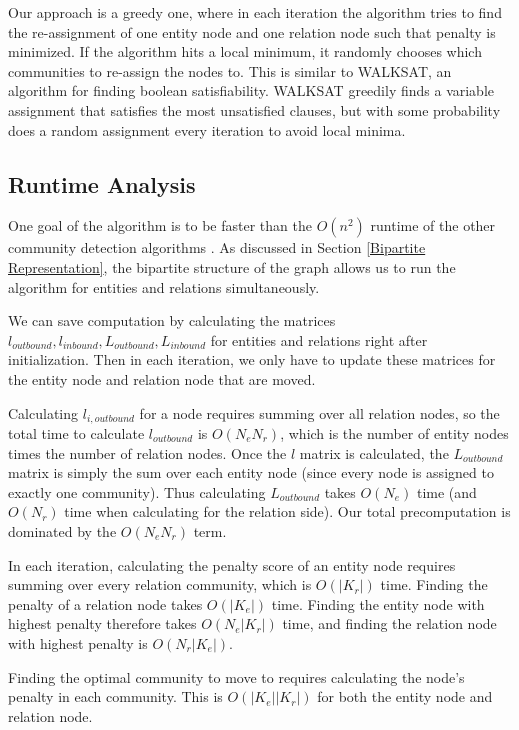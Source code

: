\documentclass[12pt]{article}
\begin{document}
Our approach is a greedy one, where in each iteration the algorithm tries to
find the re-assignment of one entity node and one relation node such that
penalty is minimized. If the algorithm hits a local minimum, it randomly chooses
which communities to re-assign the nodes to. This is similar to WALKSAT, an
algorithm for finding boolean satisfiability. WALKSAT greedily finds a variable
assignment that satisfies the most unsatisfied clauses, but with some
probability does a random assignment every iteration to avoid local minima.

\subsection{Runtime Analysis}
\label{Runtime Analysis}

One goal of the algorithm is to be faster than the $O(n^2)$ runtime of the other
community detection algorithms \cite{Kernighan1970, Girvan2002, Larremore2014}.
As discussed in Section \ref{Bipartite Representation}, the bipartite structure
of the graph allows us to run the algorithm for entities and relations
simultaneously.

We can save computation by calculating the matrices $l_{outbound}, l_{inbound},
L_{outbound}, L_{inbound}$ for entities and relations right after
initialization. Then in each iteration, we only have to update these matrices
for the entity node and relation node that are moved.

Calculating $l_{i, outbound}$ for a node requires summing over all relation
nodes, so the total time to calculate $l_{outbound}$ is $O(N_eN_r)$, which is
the number of entity nodes times the number of relation nodes. Once the $l$
matrix is calculated, the $L_{outbound}$ matrix is simply the sum over each
entity node (since every node is assigned to exactly one community). Thus
calculating $L_{outbound}$ takes $O(N_e)$ time (and $O(N_r)$ time when
calculating for the relation side). Our total precomputation is dominated by the
$O(N_eN_r)$ term.

In each iteration, calculating the penalty score of an entity node requires
summing over every relation community, which is $O(|K_r|)$ time. Finding the
penalty of a relation node takes $O(|K_e|)$ time. Finding the entity node with
highest penalty therefore takes $O(N_e|K_r|)$ time, and finding the relation
node with highest penalty is $O(N_r|K_e|)$.

Finding the optimal community to move to requires calculating the node's penalty
in each community. This is $O(|K_e||K_r|)$ for both the entity node and relation
node.
\end{document}
